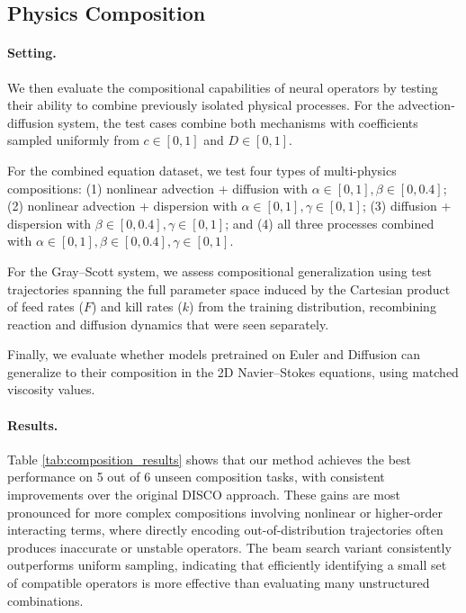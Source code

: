 \documentclass{article}
\theoremstyle{plain}
\theoremstyle{definition}
\theoremstyle{remark}
\begin{document}
\subsection{Physics Composition}
\label{subsec:physics-composition}


\paragraph{Setting.}
We then evaluate the compositional capabilities of neural operators by testing their ability to combine previously isolated physical processes. For the advection-diffusion system, the test cases combine both mechanisms with coefficients sampled uniformly from $c \in [0,1]$ and $D \in [0,1]$.

For the combined equation dataset, we test four types of multi-physics compositions: (1) nonlinear advection + diffusion with $\alpha \in [0,1], \beta \in [0, 0.4]$; (2) nonlinear advection + dispersion with $\alpha \in [0,1], \gamma \in [0,1]$; (3) diffusion + dispersion with $\beta \in [0, 0.4], \gamma \in [0,1]$; and (4) all three processes combined with $\alpha \in [0,1], \beta \in [0, 0.4], \gamma \in [0,1]$. 


For the Gray–Scott system, we assess compositional generalization using test trajectories spanning the full parameter space induced by the Cartesian product of feed rates ($F$) and kill rates ($k$) from the training distribution, recombining reaction and diffusion dynamics that were seen separately.

Finally, we evaluate whether models pretrained on Euler and Diffusion 
can generalize to their composition in the 2D Navier--Stokes equations, using
matched viscosity values.


\paragraph{Results.}
Table \ref{tab:composition_results} shows that our method achieves the best performance on 5 out of 6 unseen composition tasks, with consistent improvements over the original DISCO approach. These gains are most pronounced for more complex compositions involving nonlinear or higher-order interacting terms, where directly encoding out-of-distribution trajectories often produces inaccurate or unstable operators. %
The beam search variant consistently outperforms uniform sampling, indicating that efficiently identifying a small set of compatible operators is more effective than evaluating many unstructured combinations.
\end{document}
